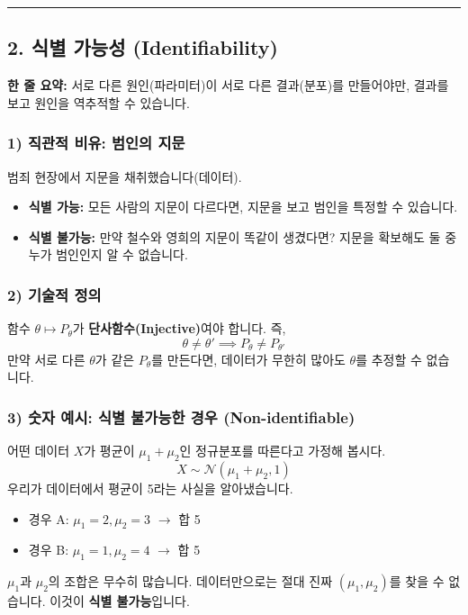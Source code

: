 \documentclass[11pt,a4paper]{book}
\theoremstyle{definition}
\begin{document}
\vspace{0.5cm}\hrule\vspace{0.5cm}

\subsection{2. 식별 가능성 (Identifiability)}

\begin{conceptbox}[title={개념 2: 이 모델로 정답을 찾을 수 있는가?}]
\textbf{한 줄 요약:} 서로 다른 원인(파라미터)이 서로 다른 결과(분포)를 만들어야만, 결과를 보고 원인을 역추적할 수 있습니다.
\end{conceptbox}

\subsubsection*{1) 직관적 비유: 범인의 지문}
범죄 현장에서 지문을 채취했습니다(데이터).
\begin{itemize}
    \item \textbf{식별 가능:} 모든 사람의 지문이 다르다면, 지문을 보고 범인을 특정할 수 있습니다.
    \item \textbf{식별 불가능:} 만약 철수와 영희의 지문이 똑같이 생겼다면? 지문을 확보해도 둘 중 누가 범인인지 알 수 없습니다.
\end{itemize}

\subsubsection*{2) 기술적 정의}
함수 $\theta \mapsto P_\theta$가 \textbf{단사함수(Injective)}여야 합니다.
즉,
$$ \theta \neq \theta' \implies P_\theta \neq P_{\theta'} $$
만약 서로 다른 $\theta$가 같은 $P_\theta$를 만든다면, 데이터가 무한히 많아도 $\theta$를 추정할 수 없습니다.

\subsubsection*{3) 숫자 예시: 식별 불가능한 경우 (Non-identifiable)}
어떤 데이터 $X$가 평균이 $\mu_1 + \mu_2$인 정규분포를 따른다고 가정해 봅시다.
$$ X \sim \mathcal{N}(\mu_1 + \mu_2, 1) $$
우리가 데이터에서 평균이 5라는 사실을 알아냈습니다.
\begin{itemize}
    \item 경우 A: $\mu_1 = 2, \mu_2 = 3$ $\rightarrow$ 합 5
    \item 경우 B: $\mu_1 = 1, \mu_2 = 4$ $\rightarrow$ 합 5
\end{itemize}
$\mu_1$과 $\mu_2$의 조합은 무수히 많습니다. 데이터만으로는 절대 진짜 $(\mu_1, \mu_2)$를 찾을 수 없습니다. 이것이 \textbf{식별 불가능}입니다.
\end{document}
